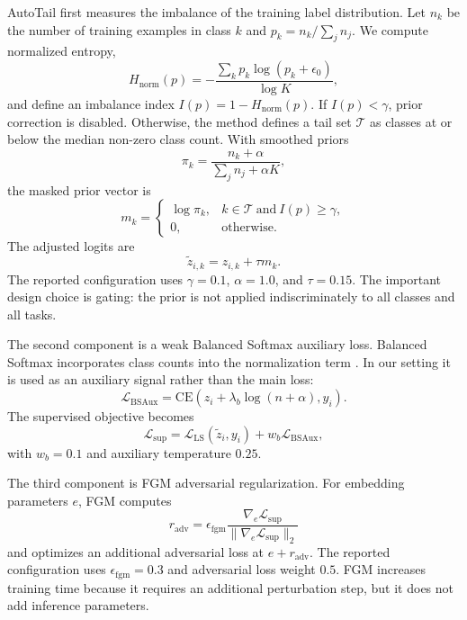 \documentclass[10pt]{article}
\begin{document}
AutoTail first measures the imbalance of the training label distribution. Let $n_k$ be the number of training examples in class $k$ and $p_k=n_k/\sum_j n_j$. We compute normalized entropy,
\begin{equation}
H_{\mathrm{norm}}(p)=-\frac{\sum_k p_k\log(p_k+\epsilon_0)}{\log K},
\end{equation}
and define an imbalance index $I(p)=1-H_{\mathrm{norm}}(p)$. If $I(p)<\gamma$, prior correction is disabled. Otherwise, the method defines a tail set $\mathcal{T}$ as classes at or below the median non-zero class count. With smoothed priors
\begin{equation}
\pi_k=\frac{n_k+\alpha}{\sum_j n_j+\alpha K},
\end{equation}
the masked prior vector is
\begin{equation}
m_k=
\begin{cases}
\log \pi_k, & k\in\mathcal{T}\ \mathrm{and}\ I(p)\geq\gamma,\\
0, & \mathrm{otherwise}.
\end{cases}
\end{equation}
The adjusted logits are
\begin{equation}
\tilde{z}_{i,k}=z_{i,k}+\tau m_k.
\end{equation}
The reported configuration uses $\gamma=0.1$, $\alpha=1.0$, and $\tau=0.15$. The important design choice is gating: the prior is not applied indiscriminately to all classes and all tasks.

The second component is a weak Balanced Softmax auxiliary loss. Balanced Softmax incorporates class counts into the normalization term \citep{ren2020balanced}. In our setting it is used as an auxiliary signal rather than the main loss:
\begin{equation}
\mathcal{L}_{\mathrm{BSAux}}=\mathrm{CE}\left(z_i+\lambda_b\log(n+\alpha),y_i\right).
\end{equation}
The supervised objective becomes
\begin{equation}
\mathcal{L}_{\mathrm{sup}}=
\mathcal{L}_{\mathrm{LS}}(\tilde{z}_i,y_i) + w_b\mathcal{L}_{\mathrm{BSAux}},
\end{equation}
with $w_b=0.1$ and auxiliary temperature $0.25$.

The third component is FGM adversarial regularization. For embedding parameters $e$, FGM computes
\begin{equation}
r_{\mathrm{adv}}=\epsilon_{\mathrm{fgm}}\frac{\nabla_e \mathcal{L}_{\mathrm{sup}}}{\|\nabla_e \mathcal{L}_{\mathrm{sup}}\|_2}
\end{equation}
and optimizes an additional adversarial loss at $e+r_{\mathrm{adv}}$. The reported configuration uses $\epsilon_{\mathrm{fgm}}=0.3$ and adversarial loss weight $0.5$. FGM increases training time because it requires an additional perturbation step, but it does not add inference parameters.
\end{document}
